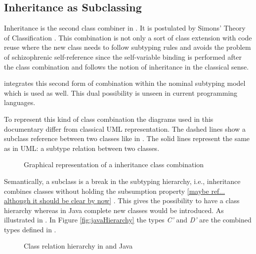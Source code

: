 \subsection{Inheritance as Subclassing}
Inheritance is the second class combiner in \ooplss. It is postulated
by Simons' Theory of Classification \cite{simons_theory_2004-2}.
This combination is not only a sort of class extension with code
reuse where the new class needs to follow subtyping rules and avoids
the problem of schizophrenic self-reference since the self-variable
binding is performed after the class combination and follows the notion
of inheritance in the classical sense. 

\ooplss integrates this second
form of combination within the nominal subtyping model which is used as
well. This dual possibility is unseen in current programming languages.

To represent this kind of class combination the diagrams used in this documentary differ from classical
UML representation. The dashed lines show a subclass reference between two classes
like in . The solid lines represent the same as in UML:
a subtype relation between two classes.

\begin{figure}
	\centering
	\caption{Graphical representation of a inheritance class combination}
	\label{fig:subclassCombination}
\end{figure}

Semantically, a subclass is a break in the subtyping hierarchy, i.e., inheritance
combines classes without holding the subsumption property \ref{maybe ref... although it should be clear by now}
. This gives \ooplss
the possibility to have a class hierarchy whereas in Java complete new classes 
would be introduced. As illustrated in . In Figure
\ref{fig:javaHierarchy} the types \emph{C'} and \emph{D'} are the combined types
defined in \ooplss. 

\begin{figure}
	\centering
	\caption{Class relation hierarchy in \ooplss and Java}
	\label{fig:inheritHierarchy}
\end{figure}

